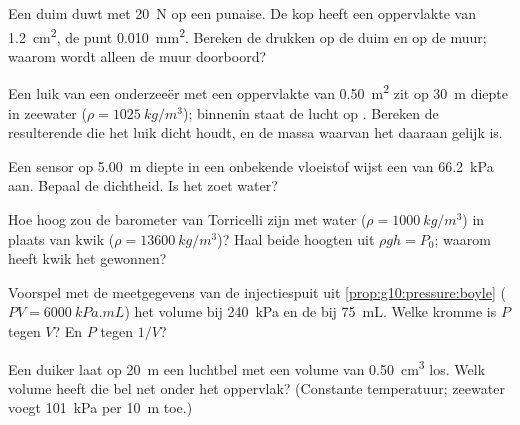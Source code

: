 \begin{exercise}[$\star\star$]\label{exo:g10:pressure:6}
Een duim duwt met \qty{20}{N} op een punaise. De kop heeft een
oppervlakte van \qty{1.2}{cm^2}, de punt \qty{0.010}{mm^2}. Bereken de
drukken op de duim en op de muur; waarom wordt alleen de muur
doorboord?
\end{exercise}

\begin{exercise}[$\star\star$]\label{exo:g10:pressure:7}
Een luik van een onderzeeër met een oppervlakte van \qty{0.50}{m^2} zit
op \qty{30}{m} diepte in zeewater ($\rho = \qty{1025}{kg/m^3}$);
binnenin staat de lucht op . Bereken de resulterende
 die het luik dicht houdt, en de massa waarvan het  daaraan
gelijk is.
\end{exercise}

\begin{exercise}[$\star\star$]\label{exo:g10:pressure:8}
Een sensor op \qty{5.00}{m} diepte in een onbekende vloeistof wijst een
 van \qty{66.2}{kPa} aan. Bepaal de dichtheid. Is het zoet
water?
\end{exercise}

\begin{exercise}[$\star\star$]\label{exo:g10:pressure:9}
Hoe hoog zou de barometer van Torricelli zijn met water
($\rho = \qty{1000}{kg/m^3}$) in plaats van kwik
($\rho = \qty{13600}{kg/m^3}$)? Haal beide hoogten uit
$\rho g h = P_0$; waarom heeft kwik het gewonnen?
\end{exercise}

\begin{exercise}[$\star\star$]\label{exo:g10:pressure:10}
Voorspel met de meetgegevens van de injectiespuit uit
\cref{prop:g10:pressure:boyle} ($PV = \qty{6000}{kPa.mL}$) het volume
bij \qty{240}{kPa} en de  bij \qty{75}{mL}. Welke kromme is $P$
tegen $V$? En $P$ tegen $1/V$?
\end{exercise}

\begin{exercise}[$\star\star$]\label{exo:g10:pressure:11}
Een duiker laat op \qty{20}{m} een luchtbel met een volume van
\qty{0.50}{cm^3} los. Welk volume heeft die bel net onder het oppervlak?
(Constante temperatuur; zeewater voegt \qty{101}{kPa} per \qty{10}{m}
toe.)
\end{exercise}

